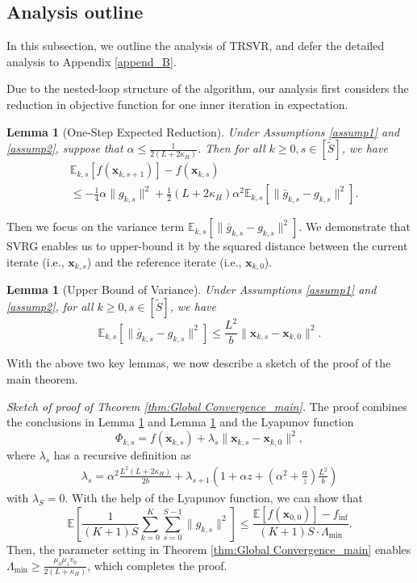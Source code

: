 \documentclass{article}
\newcommand{\bx}{\boldsymbol{x}}
\newcommand{\barg}{\bar{g}}
\theoremstyle{plain}
\newtheorem{lemma}[theorem]{Lemma}
\theoremstyle{definition}
\theoremstyle{remark}
\begin{document}
\subsection{Analysis outline}

In this subsection, we outline the analysis of TRSVR, and defer the detailed analysis to Appendix \ref{append_B}.

Due to the nested-loop structure of the algorithm, our analysis first considers the reduction in objective function for one inner iteration in expectation.
\begin{lemma}[One-Step Expected Reduction]\label{lem:exp_decrease}
Under Assumptions \ref{assump1} and \ref{assump2}, suppose that $\alpha \leq \frac{1}{2(L + 2\kappa_H)}$. Then for all $k\geq 0, s\in [\tilde{S}]$, we have
\begin{align*}
     & \mathbb{E}_{k,s}[f(\bx_{k,s+1})] - f(\bx_{k,s}) \\
     & \leq -\frac{1}{4}\alpha\|g_{k,s}\|^2 + \frac{1}{2}(L + 2\kappa_H)\alpha^2\mathbb{E}_{k,s}[\|\barg_{k,s} - g_{k,s}\|^2].
\end{align*}
\end{lemma}
Then we focus on the variance term $\mathbb{E}_{k,s}[\|\barg_{k,s} - g_{k,s}\|^2]$. We demonstrate that SVRG enables us to upper-bound it by the squared distance between the current iterate (i.e., $\bx_{k,s}$) and the reference iterate (i.e., $\bx_{k,0}$). 
\begin{lemma}[Upper Bound of Variance]\label{lem:Variance Bound}
Under Assumptions \ref{assump1} and \ref{assump2}, for all $k\geq 0,s \in [\tilde{S}]$, we have
\begin{equation*}
    \mathbb{E}_{k,s}[\|\barg_{k,s} - g_{k,s}\|^2] \leq \frac{L^2}{b}\|\bx_{k,s} - \bx_{k,0}\|^2.
\end{equation*}
\end{lemma}

With the above two key lemmas, we now describe a sketch of the proof of the main theorem.

\noindent\textit{Sketch of proof of Theorem \ref{thm:Global Convergence_main}.} The proof combines the conclusions in Lemma \ref{lem:exp_decrease} and Lemma \ref{lem:Variance Bound} and the Lyapunov function 
\begin{equation*}
   \Phi_{k,s} = f(\bx_{k,s}) + \lambda_s\|\bx_{k,s} - \bx_{k,0}\|^2, 
\end{equation*}
where $\lambda_s$ has a recursive definition as
\begin{align*}
    \lambda_s = \alpha^2\frac{L^2(L+ 2\kappa_H)}{2b} + \lambda_{s+1}\left(1+\alpha z+\left(\alpha^2+\frac{\alpha}{z}\right)\frac{L^2}{b}\right)
\end{align*}
with $\lambda_S=0$. With the help of the Lyapunov function, we can show that  
\begin{equation*}
     \mathbb{E}\left[\frac{1}{(K+1)S}\sum_{k=0}^K\sum_{s=0}^{S-1}\|g_{k,s}\|^2\right] \leq \frac{\mathbb{E}[f(\bx_{0,0})] - f_{\inf}}{(K+1)S \cdot \Lambda_{\min}}.
\end{equation*}
Then, the parameter setting in Theorem \ref{thm:Global Convergence_main} enables $ \Lambda_{\min} \geq \frac{\mu_0\mu_1 v_0}{2(L+\kappa_H)}$, which completes the proof.
\end{document}
